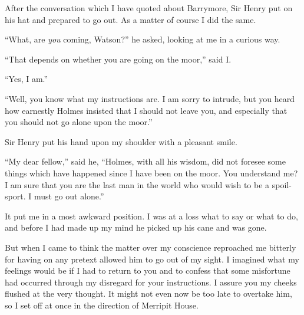 \documentclass[paper=a5,BCOR=7mm,twoside,DIV=calc,12pt,usegeometry,openany,chapterprefix,endperiod,headings=big]{scrbook} %
\begin{document}
After the conversation which I have quoted about Barrymore, Sir Henry put on his hat and prepared to go out. As a matter of course I did the same.

\enquote{What, are \emph{you} coming, Watson?} he asked, looking at me in a curious way.

\enquote{That depends on whether you are going on the moor,} said I.

\enquote{Yes, I am.}

\enquote{Well, you know what my instructions are. I am sorry to intrude, but you heard how earnestly Holmes insisted that I should not leave you, and especially that you should not go alone upon the moor.}

Sir Henry put his hand upon my shoulder with a pleasant smile.

\enquote{My dear fellow,} said he, \enquote{Holmes, with all his wisdom, did not foresee some things which have happened since I have been on the moor. You understand me? I am sure that you are the last man in the world who would wish to be a spoil-sport. I must go out alone.}

It put me in a most awkward position. I was at a loss what to say or what to do, and before I had made up my mind he picked up his cane and was gone.

But when I came to think the matter over my conscience reproached me bitterly for having on any pretext allowed him to go out of my sight. I imagined what my feelings would be if I had to return to you and to confess that some misfortune had occurred through my disregard for your instructions. I assure you my cheeks flushed at the very thought. It might not even now be too late to overtake him, so I set off at once in the direction of Merripit House.

\end{document}
